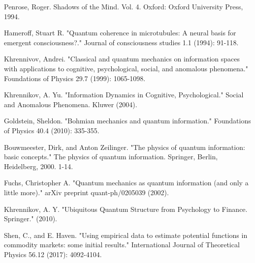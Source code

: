 \documentclass[a4paper,titlepage,12pt,fleqn,oneside]{report}
\begin{document}
\begin{thebibliography}{99}
\begin{LTRitems}
	Penrose, Roger. Shadows of the Mind. Vol. 4. Oxford: Oxford University Press, 1994.
\end{LTRitems}

\begin{LTRitems}
	Hameroff, Stuart R. "Quantum coherence in microtubules: A neural basis for emergent consciousness?." Journal of consciousness studies 1.1 (1994): 91-118.
\end{LTRitems}

\begin{LTRitems}
	Khrennivov, Andrei. "Classical and quantum mechanics on information spaces with applications to cognitive, psychological, social, and anomalous phenomena." Foundations of Physics 29.7 (1999): 1065-1098.
\end{LTRitems}

\begin{LTRitems}
	Khrennikov, A. Yu. "Information Dynamics in Cognitive, Psychological." Social and Anomalous Phenomena. Kluwer (2004).
\end{LTRitems}

\begin{LTRitems}
	Goldstein, Sheldon. "Bohmian mechanics and quantum information." Foundations of Physics 40.4 (2010): 335-355.
\end{LTRitems}

\begin{LTRitems}
	Bouwmeester, Dirk, and Anton Zeilinger. "The physics of quantum information: basic concepts." The physics of quantum information. Springer, Berlin, Heidelberg, 2000. 1-14.
\end{LTRitems}

\begin{LTRitems}
	Fuchs, Christopher A. "Quantum mechanics as quantum information (and only a little more)." arXiv preprint quant-ph/0205039 (2002).
\end{LTRitems}

\begin{LTRitems}
	Khrennikov, A. Y. "Ubiquitous Quantum Structure from Psychology to Finance. Springer." (2010).
\end{LTRitems}

\begin{LTRitems}
	Shen, C., and E. Haven. "Using empirical data to estimate potential functions in commodity markets: some initial results." International Journal of Theoretical Physics 56.12 (2017): 4092-4104.
\end{LTRitems}


\end{thebibliography}
\end{document}
